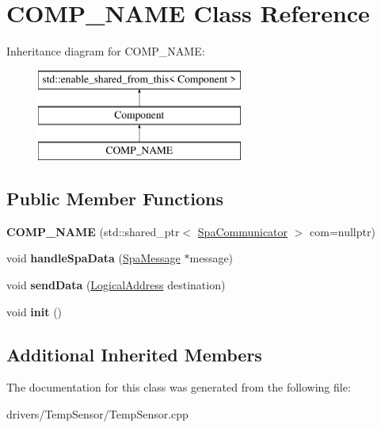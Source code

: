 \hypertarget{classCOMP__NAME}{}\section{C\+O\+M\+P\+\_\+\+N\+A\+ME Class Reference}
\label{classCOMP__NAME}
Inheritance diagram for C\+O\+M\+P\+\_\+\+N\+A\+ME\+:\begin{figure}[H]
\begin{center}
\leavevmode
\includegraphics[height=3.000000cm]{classCOMP__NAME}
\end{center}
\end{figure}
\subsection*{Public Member Functions}
\begin{DoxyCompactItemize}
\item 
\mbox{\label{classCOMP__NAME_a5e5144cab5540c8102c3c03a0ee0a768}} 
{\bfseries C\+O\+M\+P\+\_\+\+N\+A\+ME} (std\+::shared\+\_\+ptr$<$ \hyperlink{classSpaCommunicator}{Spa\+Communicator} $>$ com=nullptr)
\item 
\mbox{\label{classCOMP__NAME_a8c1d575e72e948f84891244ca3bee646}} 
void {\bfseries handle\+Spa\+Data} (\hyperlink{structSpaMessage}{Spa\+Message} $\ast$message)
\item 
\mbox{\label{classCOMP__NAME_ac981fe25a24ee01c160d08f0a970fab1}} 
void {\bfseries send\+Data} (\hyperlink{structLogicalAddress}{Logical\+Address} destination)
\item 
\mbox{\label{classCOMP__NAME_abfae2e6e6f24cee4c16800385a103ca8}} 
void {\bfseries init} ()
\end{DoxyCompactItemize}
\subsection*{Additional Inherited Members}


The documentation for this class was generated from the following file\+:\begin{DoxyCompactItemize}
\item 
drivers/\+Temp\+Sensor/Temp\+Sensor.\+cpp\end{DoxyCompactItemize}
